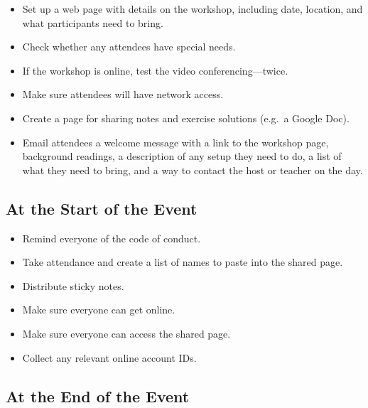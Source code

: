 \begin{itemize}

\item
  Set up a web page with details on the workshop,
  including date,
  location,
  and what participants need to bring.

\item
  Check whether any attendees have special needs.

\item
  If the workshop is online, test the video conferencing---twice.

\item
  Make sure attendees will have network access.

\item
  Create a page for sharing notes and exercise solutions (e.g.\ a Google Doc).

\item
  Email attendees a welcome message with
  a link to the workshop page,
  background readings,
  a description of any setup they need to do,
  a list of what they need to bring,
  and a way to contact the host or teacher on the day.

\end{itemize}

\subsection*{At the Start of the Event}

\begin{itemize}

\item
  Remind everyone of the code of conduct.

\item
  Take attendance
  and create a list of names to paste into the shared page.

\item
  Distribute sticky notes.

\item
  Make sure everyone can get online.
  
\item
  Make sure everyone can access the shared page.

\item
  Collect any relevant online account IDs.

\end{itemize}

\subsection*{At the End of the Event}

